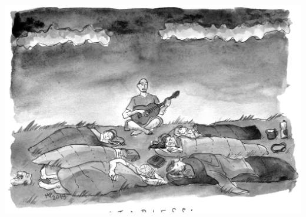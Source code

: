 \documentclass[a5paper, 10pt]{book}
\begin{document}
\includegraphics[width = \textwidth, center]{starless.png}\\

\newpage
\end{document}
